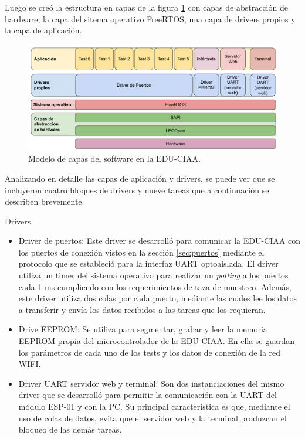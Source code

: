 Luego se creó la estructura en capas de la figura \ref{fig:CapasCIAA} con capas de abstracción de hardware, la capa del sitema operativo FreeRTOS, una capa de drivers propios y la capa de aplicación.

\begin{figure}[H]
	\centering
	\includegraphics[width=1\textwidth]{./Figures/CapasCIAA.pdf}
	\caption{Modelo de capas del software en la EDU-CIAA.}
	\label{fig:CapasCIAA}
\end{figure}

Analizando en detalle las capas de aplicación y drivers, se puede ver que se incluyeron cuatro bloques de drivers y nueve tareas que a continuación se describen brevemente.

Drivers
\begin{itemize}
	\item Driver de puertos: Este driver se desarrolló para comunicar la EDU-CIAA con los puertos de conexión vistos en la sección \ref{sec:puertos} mediante el protocolo que se estableció para la interfaz UART optoaislada. El driver utiliza un timer del sistema operativo para realizar un \textit{polling} a los puertos cada 1 ms cumpliendo con los requerimientos de taza de muestreo. Además, este driver utiliza dos colas por cada puerto, mediante las cuales lee los datos a transferir y envía los datos recibidos a las tareas que los requieran.
	\item Drive EEPROM: Se utiliza para segmentar, grabar y leer la memoria EEPROM propia del microcontrolador de la EDU-CIAA. En ella se guardan los parámetros de cada uno de los tests y los datos de conexión de la red WIFI.
	\item Driver UART servidor web y terminal: Son dos instanciaciones del mismo driver que se desarrolló para permitir la comunicación con la UART del módulo ESP-01 y con la PC. Su principal característica es que, mediante el uso de colas de datos, evita que el servidor web y la terminal produzcan el bloqueo de las demás tareas.
\end{itemize}
	
